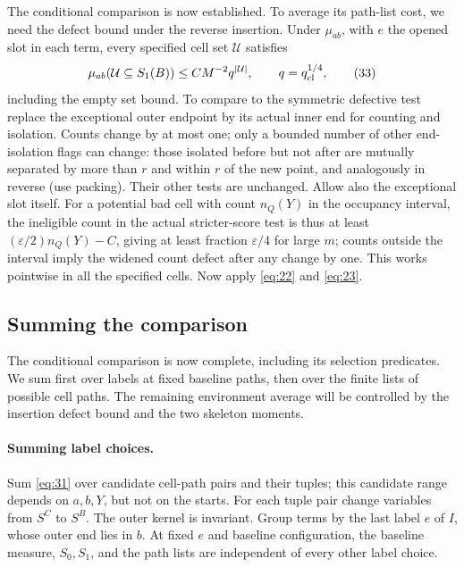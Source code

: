 The conditional comparison is now established. To average its path-list
cost, we need the defect bound under the reverse insertion. Under
$\mu_{ab}$, with $e$ the opened slot in each term, every specified
cell set $\mathcal U$ satisfies
\[
                  \mu_{ab}(\mathcal U\subseteq S_1(B))
                              \le C M^{-2} q^{|\mathcal U|},
                  \qquad q=q_{\rm cl}^{1/4},                          \tag{33}\label{eq:33}
\]
including the empty set bound. To compare to the symmetric defective test replace the exceptional outer endpoint by its actual inner end for counting and isolation. Counts change by at most one; only a bounded number of other end-isolation flags can change: those isolated before but not after are mutually separated by more than \(r\) and within \(r\) of the new point, and analogously in reverse (use packing). Their other tests are unchanged. Allow also the exceptional slot itself. For a potential bad cell with count \(n_Q(Y)\) in the occupancy interval, the ineligible count in the actual stricter-score test is thus at least \((\varepsilon/2)n_Q(Y)-C\), giving at least fraction \(\varepsilon/4\) for large \(m\); counts outside the interval imply the widened count defect after any change by one. This works pointwise in all the specified cells. Now apply \eqref{eq:22} and \eqref{eq:23}.

\subsection{Summing the comparison}

The conditional comparison is now complete, including its selection
predicates. We sum first over labels at fixed baseline paths, then over
the finite lists of possible cell paths. The remaining environment
average will be controlled by the insertion defect bound and the two
skeleton moments.

\paragraph{Summing label choices.}
Sum \eqref{eq:31} over candidate cell-path pairs and their tuples; this
candidate range depends on $a,b,Y$, but not on the starts. For each
tuple pair change variables from $S^C$ to $S^B$. The outer kernel is
invariant. Group terms by the last label $e$ of $I$, whose outer end
lies in $b$. At fixed $e$ and baseline configuration, the baseline
measure, $S_0,S_1$, and the path lists are independent of every other
label choice.

